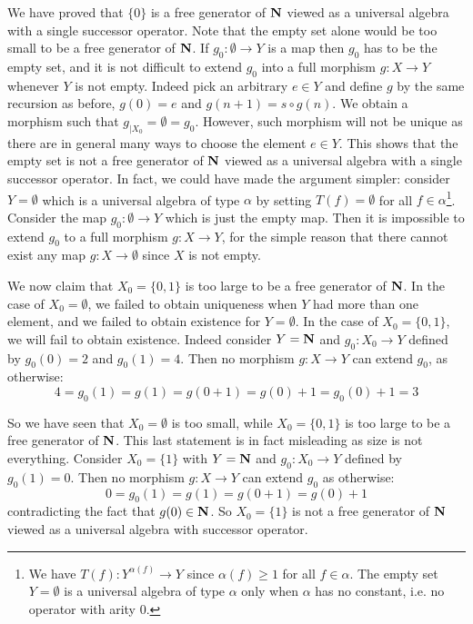 We have proved that $\{0\}$ is a free generator of $\mbox{$\bf N$}$ viewed as a
universal algebra with a single successor operator. Note that the
empty set alone would be too small to be a free generator of $\mbox{$\bf N$}$.
If $g_{0}:\emptyset\to Y$ is a map then $g_{0}$ has to be the empty
set, and it is not difficult to extend $g_{0}$ into a full morphism
$g:X\to Y$ whenever $Y$ is not empty. Indeed pick an arbitrary $e\in
Y$ and define $g$ by the same recursion as before, $g(0)=e$ and
$g(n+1)=s\circ g(n)$. We obtain a morphism such that
$g_{|X_{0}}=\emptyset=g_{0}$. However, such morphism will not be
unique as there are in general many ways to choose the element $e\in
Y$. This shows that the empty set is not a free generator of $\mbox{$\bf N$}$
viewed as a universal algebra with a single successor operator. In
fact, we could have made the argument simpler: consider
$Y=\emptyset$ which is a universal algebra of type $\alpha$ by
setting $T(f)=\emptyset$ for all $f\in\alpha$\footnote{We have
$T(f):Y^{\alpha(f)}\to Y$ since $\alpha(f)\geq 1$ for all
$f\in\alpha$. The empty set $Y=\emptyset$ is a universal algebra of
type $\alpha$ only when $\alpha$ has no constant, i.e. no operator
with arity $0$.}. Consider the map $g_{0}:\emptyset\to Y$ which is
just the empty map. Then it is impossible to extend $g_{0}$ to a
full morphism $g:X\to Y$, for the simple reason that there cannot
exist any map $g:X\to\emptyset$ since $X$ is not empty.

We now claim that $X_{0}=\{0,1\}$ is too large to be a free
generator of $\mbox{$\bf N$}$. In the case of $X_{0}=\emptyset$, we failed to
obtain uniqueness when $Y$ had more than one element, and we failed
to obtain existence for $Y=\emptyset$. In the case of
$X_{0}=\{0,1\}$, we will fail to obtain existence. Indeed consider
$Y=\mbox{$\bf N$}$ and $g_{0}:X_{0}\to Y$ defined by $g_{0}(0)=2$ and
$g_{0}(1)=4$. Then no morphism $g:X\to Y$ can extend $g_{0}$, as
otherwise:
    \[
    4 = g_{0}(1)=g(1)=g(0+1)=g(0)+1 = g_{0}(0) + 1 = 3
    \]

So we have seen that $X_{0}=\emptyset$ is too small, while
$X_{0}=\{0,1\}$ is too large to be a free generator of $\mbox{$\bf N$}$. This
last statement is in fact misleading as size is not everything.
Consider $X_{0}=\{1\}$ with $Y=\mbox{$\bf N$}$ and $g_{0}:X_{0}\to Y$ defined by
$g_{0}(1)=0$. Then no morphism $g:X\to Y$ can extend $g_{0}$ as
otherwise:
    \[
    0 = g_{0}(1)=g(1)=g(0+1)=g(0)+1
    \]
contradicting the fact that $g(0)\in\mbox{$\bf N$}$. So $X_{0}=\{1\}$ is not a
free generator of $\mbox{$\bf N$}$ viewed as a universal algebra with successor
operator.

